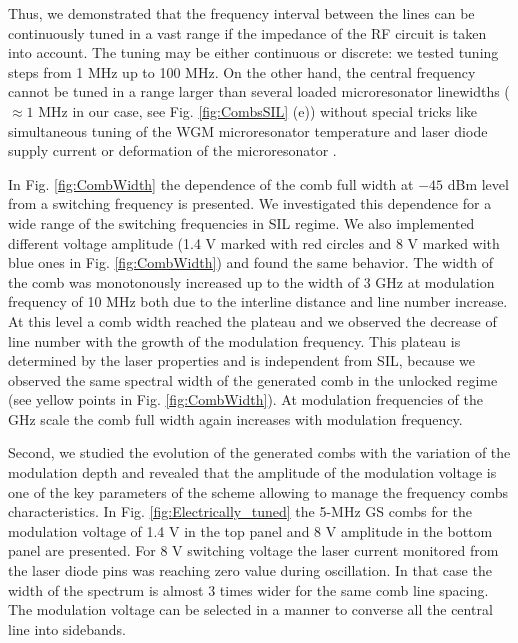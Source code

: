 \documentclass[a4paper, amsfonts, amssymb, amsmath, reprint, showkeys, nofootinbib, twoside,longbibliography, aps]{revtex4-1}
\begin{document}
Thus, we demonstrated that the frequency interval between the lines can be continuously tuned in a vast range if the impedance of the RF circuit is taken into account. The tuning may be either continuous or discrete: we tested tuning steps from 1 MHz up to 100 MHz. On the other hand, the central frequency cannot be tuned in a range larger than several loaded microresonator linewidths ($\approx 1$ MHz in our case, see Fig. \ref{fig:CombsSIL} (e)) without special tricks like simultaneous tuning of the WGM microresonator temperature \cite{Liang2015compact} and laser diode supply current or deformation of the microresonator \cite{liu2020monolithic}. 

In Fig. \ref{fig:CombWidth} the dependence of the comb full width at $-45$ dBm level from a switching frequency is presented. We investigated this dependence for a wide range of the switching frequencies in SIL regime. We also implemented different voltage amplitude (1.4 V marked with red circles and 8 V marked with blue ones in Fig. \ref{fig:CombWidth}) and found the same behavior. The width of the comb was monotonously increased up to the width of 3 GHz at modulation frequency of 10 MHz both due to the interline distance and line number increase. At this level a comb width reached the plateau and we observed the decrease of line number with the growth of the modulation frequency. This plateau is determined by the laser properties and is independent from SIL, because we observed the same spectral width of the generated comb in the unlocked regime (see yellow points in Fig. \ref{fig:CombWidth}). At modulation frequencies of the GHz scale the comb full width again increases with modulation frequency. 


Second, we studied the evolution of the generated combs with the variation of the modulation depth and revealed that the amplitude of the modulation voltage is one of the key parameters of the scheme allowing to manage the frequency combs characteristics. In Fig. \ref{fig:Electrically_tuned} the 5-MHz GS combs for the modulation voltage of 1.4 V in the top panel and 8 V amplitude in the bottom panel are presented. For 8 V switching voltage the laser current monitored from the laser diode pins was reaching zero value during oscillation. In that case the width of the spectrum is almost 3 times wider for the same comb line spacing. The modulation voltage can be selected in a manner to converse all the central line into sidebands.
\end{document}
